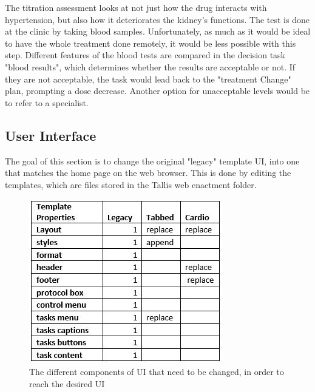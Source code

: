 \documentclass[11pt]{article}
\begin{document}
The titration assessment looks at not just how the drug interacts with hypertension, but also how it deteriorates the kidney's functions.  The test is done at the clinic by taking blood samples. Unfortunately, as much as it would be ideal to have the whole treatment done remotely, it would be less possible with this step.  Different features of the blood tests are compared in the decision task "blood results", which determines whether the results are acceptable or not.  If they are not acceptable, the task would lead back to the "treatment Change" plan, prompting a dose decrease.  Another option for unacceptable levels would be to refer to a specialist.

\subsection{User Interface}
The goal of this section is to change the original "legacy" template UI, into one that matches the home page on the web browser.  This is done by editing the templates, which are files stored in the Tallis web enactment folder.  

\begin{figure}[ht]
\begin{center}
\includegraphics[scale=0.8]{tallisUItable}
\caption{The different components of UI that need to be changed, in order to reach the desired UI}
\label{fig:tallisUItable}
\end{center}
\end{figure}
\end{document}
